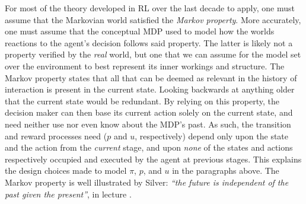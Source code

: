 For most of the theory developed in RL over the last decade to apply,
one must assume that the Markovian world satisfied the \emph{Markov property}.
More accurately, one must assume that the conceptual MDP used to model how the worlds
reactions to the agent's decision follows said property.
The latter is likely not a property verified by the \emph{real} world,
but one that we can assume for the model set over the environment to best
represent its inner workings and structure.
The Markov property states that all that can be deemed as relevant in the history of interaction
is present in the current state. Looking backwards at anything older that the current state would be redundant.
By relying on this property,
the decision maker can then base its current action solely on the current state,
and need neither use nor even know about the MDP's past.
As such, the transition and reward processes need
($p$ and $u$, respectively) depend only upon the state and the action from the \emph{current} stage,
and upon \emph{none} of the states and actions respectively occupied and executed by the agent at previous stages.
This explains the design choices made to model $\pi$, $p$, and $u$ in the paragraphs above.
The Markov property is well illustrated by Silver:
\textit{``the future is independent of the past given the present''}, in lecture \cite{Silver2015-wm}.


